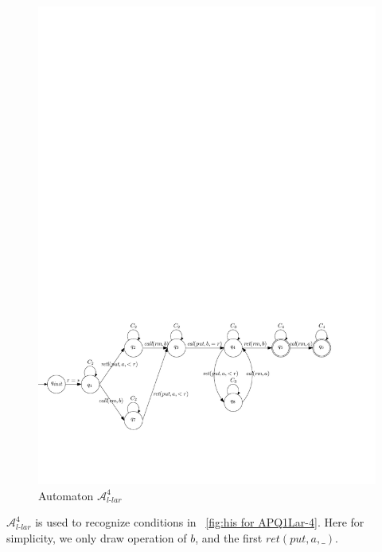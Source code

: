 \begin{figure}[htbp]
  \centering
  \includegraphics[width=0.9 \textwidth]{figures/PIC_AUTO_PQ1Lar-rprp.pdf}
  \caption{Automaton $\mathcal{A}_{\textit{l-lar}}^4$}
  \label{fig:automata APQ1Lar-4}
\end{figure}


$\mathcal{A}_{\textit{l-lar}}^4$ is used to recognize conditions in \figurename~\ref{fig:his for APQ1Lar-4}. Here for simplicity, we only draw operation of $b$, and the first $\textit{ret}(\textit{put},a,\_)$.



